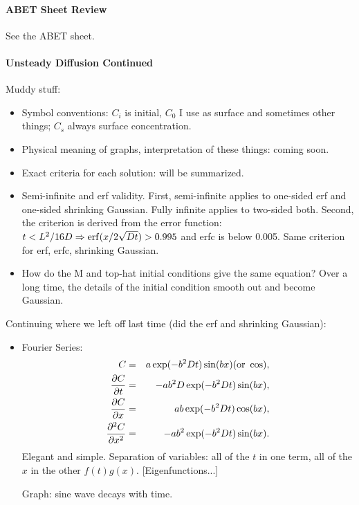 \documentclass{report}
\begin{document}
\paragraph{ABET Sheet Review}

See the ABET sheet.

\paragraph{Unsteady Diffusion Continued}

Muddy stuff:
\begin{itemize}
\item Symbol conventions: $C_i$ is initial, $C_0$ I use as surface and
  sometimes other things; $C_s$ always surface concentration.
\item Physical meaning of graphs, interpretation of these things: coming soon.
\item Exact criteria for each solution: will be summarized.
\item Semi-infinite and erf validity.  First, semi-infinite applies to
  one-sided erf and one-sided shrinking Gaussian.  Fully infinite applies to
  two-sided both.  Second, the criterion is derived from the error function:
  $t<L^2/16D \Rightarrow {\rm erf}(x/2\sqrt{Dt}) > 0.995$ and erfc is below
  0.005.  Same criterion for erf, erfc, shrinking Gaussian.
\item How do the M and top-hat initial conditions give the same equation?  Over
  a long time, the details of the initial condition smooth out and become
  Gaussian.
\end{itemize}

\noindent Continuing where we left off last time (did the erf and shrinking
  Gaussian):
\begin{itemize}
\item Fourier Series:
  \begin{eqnarray}
    \label{eq:fourier}
    C &=& a \exp(-b^2Dt) \sin(bx) ({\rm or }\ \cos), \\
    \frac{\partial C}{\partial t} &=& -ab^2D \exp(-b^2Dt) \sin(bx), \\
    \frac{\partial C}{\partial x} &=& ab \exp(-b^2Dt) \cos(bx), \\
    \frac{\partial^2 C}{\partial x^2} &=& -ab^2 \exp(-b^2Dt) \sin(bx). \\
  \end{eqnarray}
  Elegant and simple.  Separation of variables: all of the $t$ in one term, all
  of the $x$ in the other $f(t)g(x)$.  [Eigenfunctions...]

  Graph: sine wave decays with time.
\end{itemize}
\newpage
\end{document}
